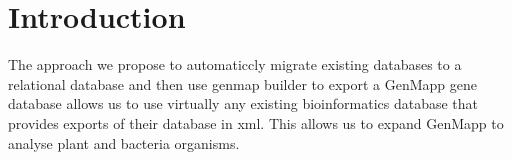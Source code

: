 \section{Introduction}
  The approach we propose to automaticcly migrate existing databases to a relational database and then use genmap builder to export a GenMapp gene database allows us to use virtually any existing bioinformatics database that provides exports of their database in xml.  This allows us to expand GenMapp to analyse plant and bacteria organisms.  

